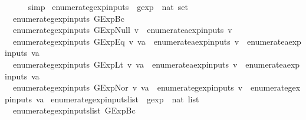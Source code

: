 \begin{isabellebody}
\ \ \ \ \isamarkupfalse%
\ simp\isanewline
{}\isamarkupfalse%
%
\endisatagproof
{\isafoldproof}%
%
\isadelimproof
\isanewline
%
\endisadelimproof
\isanewline
{}\isamarkupfalse%
\ enumerate{\isacharunderscore}gexp{\isacharunderscore}inputs\ {\isacharcolon}{\isacharcolon}\ {\isachardoublequoteopen}gexp\ {\isasymRightarrow}\ nat\ set{\isachardoublequoteclose}\ \isanewline
\ \ {\isachardoublequoteopen}enumerate{\isacharunderscore}gexp{\isacharunderscore}inputs\ {\isacharparenleft}GExp{\isachardot}Bc\ {\isacharunderscore}{\isacharparenright}\ {\isacharequal}\ {\isacharbraceleft}{\isacharbraceright}{\isachardoublequoteclose}\ {\isacharbar}\isanewline
\ \ {\isachardoublequoteopen}enumerate{\isacharunderscore}gexp{\isacharunderscore}inputs\ {\isacharparenleft}GExp{\isachardot}Null\ v{\isacharparenright}\ {\isacharequal}\ enumerate{\isacharunderscore}aexp{\isacharunderscore}inputs\ v{\isachardoublequoteclose}\ {\isacharbar}\isanewline
\ \ {\isachardoublequoteopen}enumerate{\isacharunderscore}gexp{\isacharunderscore}inputs\ {\isacharparenleft}GExp{\isachardot}Eq\ v\ va{\isacharparenright}\ {\isacharequal}\ enumerate{\isacharunderscore}aexp{\isacharunderscore}inputs\ v\ {\isasymunion}\ enumerate{\isacharunderscore}aexp{\isacharunderscore}inputs\ va{\isachardoublequoteclose}\ {\isacharbar}\isanewline
\ \ {\isachardoublequoteopen}enumerate{\isacharunderscore}gexp{\isacharunderscore}inputs\ {\isacharparenleft}GExp{\isachardot}Lt\ v\ va{\isacharparenright}\ {\isacharequal}\ enumerate{\isacharunderscore}aexp{\isacharunderscore}inputs\ v\ {\isasymunion}\ enumerate{\isacharunderscore}aexp{\isacharunderscore}inputs\ va{\isachardoublequoteclose}\ {\isacharbar}\isanewline
\ \ {\isachardoublequoteopen}enumerate{\isacharunderscore}gexp{\isacharunderscore}inputs\ {\isacharparenleft}GExp{\isachardot}Nor\ v\ va{\isacharparenright}\ {\isacharequal}\ enumerate{\isacharunderscore}gexp{\isacharunderscore}inputs\ v\ {\isasymunion}\ enumerate{\isacharunderscore}gexp{\isacharunderscore}inputs\ va{\isachardoublequoteclose}\isanewline
\isanewline
{}\isamarkupfalse%
\ enumerate{\isacharunderscore}gexp{\isacharunderscore}inputs{\isacharunderscore}list\ {\isacharcolon}{\isacharcolon}\ {\isachardoublequoteopen}gexp\ {\isasymRightarrow}\ nat\ list{\isachardoublequoteclose}\ \isanewline
\ \ {\isachardoublequoteopen}enumerate{\isacharunderscore}gexp{\isacharunderscore}inputs{\isacharunderscore}list\ {\isacharparenleft}GExp{\isachardot}Bc\ {\isacharunderscore}{\isacharparenright}\ {\isacharequal}\ {\isacharbrackleft}{\isacharbrackright}{\isachardoublequoteclose}\ {\isacharbar}\isanewline

\end{isabellebody}
